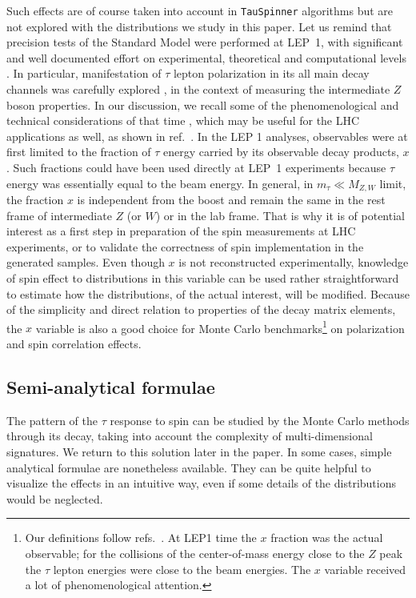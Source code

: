 \documentclass{article}
\begin{document}
Such effects 
are of course taken into account in {\tt TauSpinner} algorithms
but are not explored with  the distributions we study in this paper.
Let us remind that
precision tests of the Standard Model were performed at LEP~1, with significant
and well documented effort
on experimental, theoretical and computational 
levels \cite{Altarelli:1989hv,Altarelli:1989hx}. In particular, manifestation 
of $\tau$ lepton 
polarization in its all main decay channels was carefully explored
 \cite{Heister:2001uh}, in the context of  measuring the intermediate $Z$ boson
properties.
In our  discussion, we recall some of the  phenomenological and technical 
considerations 
of that time \cite{jadach-was:1984,Eberhard:1989ve}, which may be useful 
for the LHC applications as well, as shown in ref.~\cite{Pierzchala:2001gc}.
 In the LEP 1 analyses, observables 
were   at first limited 
to the fraction of $\tau$ energy carried by its observable decay products, $x$.
Such fractions could have been used directly at LEP~1 experiments because 
$\tau$ energy was essentially equal to the beam energy. In general,
 in $m_\tau \ll M_{Z,W}$ limit, the fraction $x$ is independent from the 
boost and remain  the same in the rest frame of intermediate
$Z$ (or $W$) or in the lab frame. That is why it is of potential interest
 as a first step in preparation 
of  the spin measurements at LHC experiments, or to validate 
the correctness of spin implementation in the generated samples.
Even though $x$ is not reconstructed experimentally, knowledge of
spin effect to  distributions in this variable can be used  rather straightforward to estimate how the
distributions, of the actual interest, will be modified. Because of the simplicity
and direct relation to properties of the decay matrix elements, the $x$  
variable is also a good choice for Monte Carlo benchmarks\footnote{
Our definitions   follow refs.~\cite{jadach-was:1984,Eberhard:1989ve,Pierzchala:2001gc}.
At LEP1 time the $x$ fraction was the actual observable; for the collisions of the 
center-of-mass energy close to 
 the $Z$ peak the $\tau$ lepton energies
were  close to the beam energies. The $x$ variable received a lot of phenomenological attention. }
on polarization and spin correlation effects.  




\subsection{Semi-analytical formulae}

The pattern of the $\tau$ response to spin can be studied by the Monte Carlo methods through its decay, 
taking into account the complexity of multi-dimensional signatures. We return to this
solution later in the paper. 
In some cases, simple analytical formulae are nonetheless available. They can be quite helpful to 
visualize the effects in an intuitive way, even if some details  of the distributions would be neglected.
\end{document}
